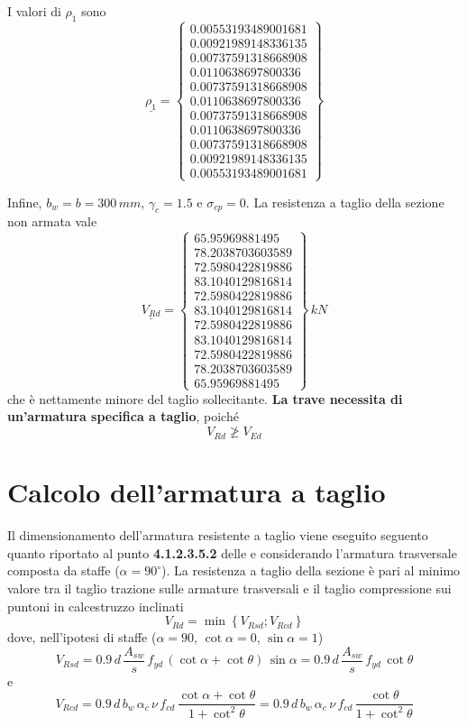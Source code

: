I valori di $\rho_1$ sono 
\[
\underline{\rho_1} = 
\begin{Bmatrix}
	0.00553193489001681\\
	0.00921989148336135\\
	0.00737591318668908\\
	0.0110638697800336\\
	0.00737591318668908\\
	0.0110638697800336\\
	0.00737591318668908\\
	0.0110638697800336\\
	0.00737591318668908\\
	0.00921989148336135\\
	0.00553193489001681
\end{Bmatrix}
\]

Infine, $b_w = b =300\,mm$, $\gamma_c = 1.5$ e $\sigma_{cp} = 0$. La resistenza a taglio della sezione non armata vale
\[
\underline{V_{Rd}} = 
\begin{Bmatrix}
	65.95969881495\\
	78.2038703603589\\
	72.5980422819886\\
	83.1040129816814\\
	72.5980422819886\\
	83.1040129816814\\
	72.5980422819886\\
	83.1040129816814\\
	72.5980422819886\\
	78.2038703603589\\
	65.95969881495
\end{Bmatrix}\,kN
\]
che è nettamente minore del taglio sollecitante. \textbf{La trave necessita di un'armatura specifica a taglio}, poiché
\[
V_{Rd} \ngeqslant V_{Ed}
\]

\section{Calcolo dell'armatura a taglio}\label{sec:armaturaTaglio}
Il dimensionamento dell'armatura resistente a taglio viene eseguito seguento quanto riportato al punto \textbf{4.1.2.3.5.2} delle \ntc e considerando l'armatura trasversale composta da staffe ($\alpha = 90^\circ$). La resistenza a taglio della sezione è pari al minimo valore tra il taglio trazione sulle armature trasversali e il taglio compressione sui puntoni in calcestruzzo inclinati
\[
V_{Rd} = \min\left\{V_{Rsd}; V_{Rcd}\right\}
\]
dove, nell'ipotesi di staffe ($\alpha = 90$, $\cot\alpha = 0$, $\sin\alpha =1$)
\[
V_{Rsd} = 0.9\,d\,\dfrac{A_{sw}}{s}\,f_{yd}\,\left(\cot\alpha + \cot\theta\right)\,\sin\alpha = 0.9\,d\,\dfrac{A_{sw}}{s}\,f_{yd}\,\cot\theta
\]
e 
\[
V_{Rcd} = 0.9\,d\,b_w\,\alpha_c\,\nu\,f_{cd}\,\dfrac{\cot\alpha + \cot\theta}{1+\cot^2\theta} = 0.9\,d\,b_w\,\alpha_c\,\nu\,f_{cd}\,\dfrac{\cot\theta}{1+\cot^2\theta}
\]


